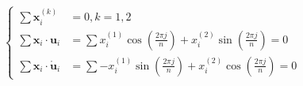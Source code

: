 \documentclass[type=bachelor]{thuthesis}
\begin{document}

\begin{align}
\begin{cases}
\sum \bm{x}_i^{(k)}&=0,k=1,2\\
\sum \bm{x}_i \cdot \bm{u}_i&=\sum x_i^{(1)} \cos(\frac{2\pi j}{n})+x_i^{(2)} \sin(\frac{2\pi j}{n})=0
\label{eq:coupling1}\\
\sum \bm{x}_i \cdot \mathring{\bm{u}}_i &=\sum -x_i^{(1)} \sin(\frac{2\pi j}{n})+x_i^{(2)} \cos(\frac{2\pi j}{n}) =0
\end{cases}
\end{align}
\end{document}
